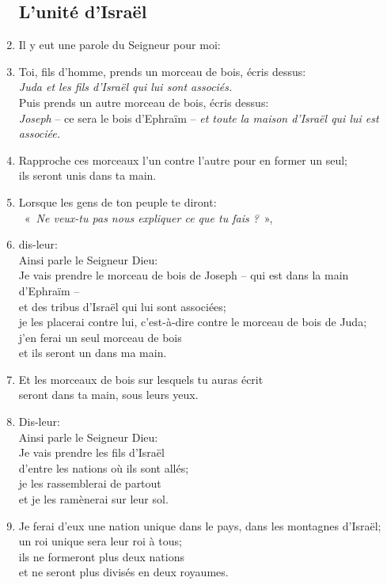 \begin{enumerate}[leftmargin=\psleftmargin, labelsep = \pslabelsep, label={\arabic*}, font=\color{\pscolor}\small\textsuperscript, parsep=0em, itemsep=0em, topsep=0em ]
          \subsection*{L'unité d'Israël}
    \item Il y eut une parole du Seigneur pour moi:
    \item Toi, fils d’homme, prends un morceau de bois, écris dessus: \\
          \decalage \textit{Juda et les fils d’Israël qui lui sont associés.} \\ Puis prends un autre morceau de bois, écris dessus: \\ \decalage \textit{Joseph} – ce sera le bois d’Ephraïm – \textit{et toute la maison d’Israël qui lui est associée.}
    \item Rapproche ces morceaux l’un contre l’autre pour en former un seul; \\ ils seront unis dans ta main.
    \item Lorsque les gens de ton peuple te diront: \\ \decalage «~\textit{Ne veux-tu pas nous expliquer ce que tu fais ?}~»,
    \item dis-leur: \\ Ainsi parle le Seigneur Dieu: \\
          Je vais prendre le morceau de bois de Joseph – qui est dans la main d’Ephraïm – \\ et des tribus d’Israël qui lui sont associées; \\ je les placerai contre lui, c’est-à-dire contre le morceau de bois de Juda; \\ j’en ferai un seul morceau de bois \\ et ils seront un dans ma main.
    \item Et les morceaux de bois sur lesquels tu auras écrit \\ seront dans ta main, sous leurs yeux.
    \item Dis-leur: \\ Ainsi parle le Seigneur Dieu: \\ Je vais prendre les fils d’Israël \\ d’entre les nations où ils sont allés; \\ je les rassemblerai de partout \\ et je les ramènerai sur leur sol.
    \item Je ferai d’eux une nation unique dans le pays, dans les montagnes d’Israël; \\ un roi unique sera leur roi à tous; \\ ils ne formeront plus deux nations \\ et ne seront plus divisés en deux royaumes.

\end{enumerate}

